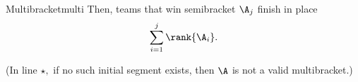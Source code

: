 {\begin{definition}{Multibracket}{multi}
        Then, teams that win semibracket $\A_j$ finish in place $$\sum_{i=1}^{j} \rank{\A_i}.$$
        
        (In line $\star,$ if no such initial segment exists, then $\A$ is not a valid multibracket.)





    \end{definition}

}


